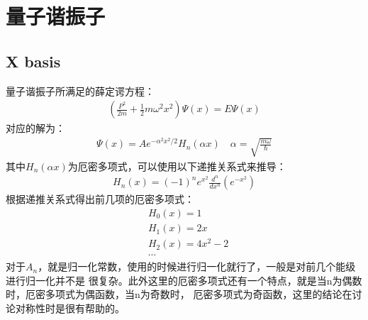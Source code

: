 \documentclass[UTF8]{article}
\numberwithin{equation}{section}
\begin{document}
\section{量子谐振子}
\subsection{X basis}
量子谐振子所满足的薛定谔方程：
\begin{align*}
    (\frac{P^2}{2m}+\frac{1}{2}m\omega^2x^2)\Psi(x)=E\Psi(x)
\end{align*}
对应的解为：
\begin{align*}
    \Psi(x) = Ae^{-\alpha^2 x^2 /2}H_n(\alpha x)\quad \alpha = \sqrt{\frac{m\omega}{\hbar}}
\end{align*}
其中$H_n(\alpha x)$为厄密多项式，可以使用以下递推关系式来推导：
\begin{align*}
    H_n(x) = (-1)^n e^{x^2}\frac{d^n}{dx^n}(e^{-x^2})
\end{align*}
根据递推关系式得出前几项的厄密多项式：
\begin{align*}
    &H_0(x) = 1\\
    &H_1(x) = 2x\\
    &H_2(x) = 4x^2-2\\
    &\cdots
\end{align*}
对于$A_n$，就是归一化常数，使用的时候进行归一化就行了，一般是对前几个能级进行归一化并不是
很复杂。此外这里的厄密多项式还有一个特点，就是当n为偶数时，厄密多项式为偶函数，当n为奇数时，
厄密多项式为奇函数，这里的结论在讨论对称性时是很有帮助的。
\end{document}
